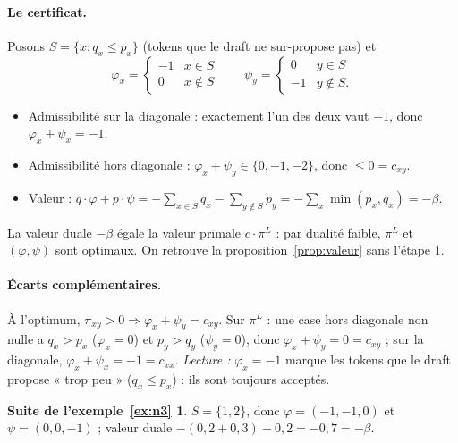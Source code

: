 \documentclass[11pt,a4paper]{article}
\theoremstyle{plain}
\theoremstyle{definition}
\newtheorem*{suite}{Suite de l'exemple~\ref{ex:n3}}
\begin{document}
\paragraph{Le certificat.} Posons $S=\{x:q_x\le p_x\}$ (tokens que le draft ne sur-propose pas) et
\[\varphi_x=\begin{cases}-1&x\in S\\0&x\notin S\end{cases}\qquad \psi_y=\begin{cases}0&y\in S\\-1&y\notin S.\end{cases}\]
\begin{itemize}
\item Admissibilité sur la diagonale : exactement l'un des deux vaut $-1$, donc $\varphi_x+\psi_x=-1$.
\item Admissibilité hors diagonale : $\varphi_x+\psi_y\in\{0,-1,-2\}$, donc $\le0=c_{xy}$.
\item Valeur : $q\cdot\varphi+p\cdot\psi=-\sum_{x\in S}q_x-\sum_{y\notin S}p_y=-\sum_x\min(p_x,q_x)=-\beta$.
\end{itemize}
La valeur duale $-\beta$ égale la valeur primale $c\cdot\pi^L$ : par dualité faible, $\pi^L$ et $(\varphi,\psi)$ sont optimaux. On retrouve la proposition~\ref{prop:valeur} sans l'étape 1.

\paragraph{Écarts complémentaires.} À l'optimum, $\pi_{xy}>0\Rightarrow\varphi_x+\psi_y=c_{xy}$. Sur $\pi^L$ : une case hors diagonale non nulle a $q_x>p_x$ ($\varphi_x=0$) et $p_y>q_y$ ($\psi_y=0$), donc $\varphi_x+\psi_y=0=c_{xy}$ ; sur la diagonale, $\varphi_x+\psi_x=-1=c_{xx}$. \emph{Lecture :} $\varphi_x=-1$ marque les tokens que le draft propose « trop peu » ($q_x\le p_x$) : ils sont toujours acceptés.

\begin{suite}
$S=\{1,2\}$, donc $\varphi=(-1,-1,0)$ et $\psi=(0,0,-1)$ ; valeur duale $-(0{,}2+0{,}3)-0{,}2=-0{,}7=-\beta$.
\end{suite}
\end{document}
